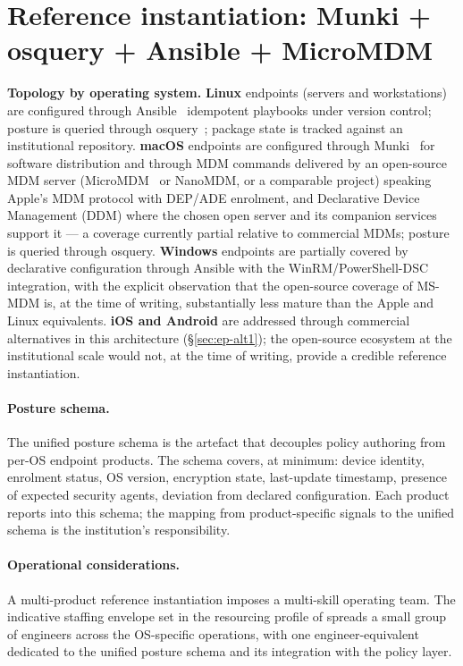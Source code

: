 \section{Reference instantiation: Munki + osquery + Ansible + MicroMDM}
\label{sec:ep-reference}

\begin{instantiationbox}
\noindent\textbf{Topology by operating system.}
\textbf{Linux} endpoints (servers and workstations) are configured
through Ansible~\cite{ansible} idempotent playbooks under version
control; posture is queried through osquery~\cite{osquery}; package
state is tracked against an institutional repository.
\textbf{macOS} endpoints are configured through Munki~\cite{munki}
for software distribution and through MDM commands delivered by an
open-source MDM server (MicroMDM~\cite{micromdm} or NanoMDM, or a
comparable project) speaking Apple's MDM protocol with DEP/ADE
enrolment, and Declarative Device Management (DDM) where the chosen
open server and its companion services support it --- a coverage
currently partial relative to commercial MDMs; posture is
queried through osquery. \textbf{Windows} endpoints are partially
covered by declarative configuration through Ansible with the
WinRM/PowerShell-DSC integration, with the explicit observation
that the open-source coverage of MS-MDM is, at the time of writing,
substantially less mature than the Apple and Linux equivalents.
\textbf{iOS and Android} are addressed through commercial
alternatives in this architecture (\S\ref{sec:ep-alt1}); the
open-source ecosystem at the institutional scale would not, at the
time of writing, provide a credible reference instantiation.
\end{instantiationbox}

\paragraph{Posture schema.} The unified posture schema is the
artefact that decouples policy authoring from per-OS endpoint
products. The schema covers, at minimum: device identity,
enrolment status, OS version, encryption state, last-update
timestamp, presence of expected security agents, deviation from
declared configuration. Each product reports into this schema; the
mapping from product-specific signals to the unified schema is the
institution's responsibility.

\paragraph{Operational considerations.} A multi-product reference
instantiation imposes a multi-skill operating team. The indicative
staffing envelope set in the resourcing profile of 
spreads a small group
of engineers across the OS-specific operations, with one
engineer-equivalent dedicated to the unified posture schema and
its integration with the policy layer.

